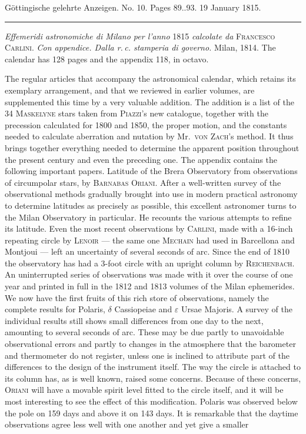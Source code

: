 \clearpage
{}
\hypertarget{native-579-lower}{}
\begin{center}\small Göttingische gelehrte Anzeigen. No. 10. Pages 89..93. 19 January 1815.\\[3pt]\rule{.72\linewidth}{.3pt}\end{center}

{\setlength{\rightskip}{0pt plus 3em}\emph{Effemeridi astronomiche di Milano per l'anno} 1815 \emph{calcolate da} \textsc{Francesco Carlini}.
\emph{Con appendice. Dalla r.\,c. stamperia di governo.} Milan, 1814. The calendar has 128 pages and the appendix 118, in octavo.\par}

The regular articles that accompany the astronomical calendar, which retains its exemplary arrangement, and that we reviewed in earlier volumes, are supplemented this time by a very valuable addition. The addition is a list of the 34 \textsc{Maskelyne} stars taken from \textsc{Piazzi}’s new catalogue, together with the precession calculated for 1800 and 1850, the proper motion, and the constants needed to calculate aberration and nutation by Mr.\ \textsc{von Zach}’s method. It thus brings together everything needed to determine the apparent position throughout the present century and even the preceding one. The appendix contains the following important papers. Latitude of the Brera Observatory from observations of circumpolar stars, by \textsc{Barnabas Oriani}. After a well-written survey of the observational methods gradually brought into use in modern practical astronomy to determine latitudes as precisely as possible, this excellent astronomer turns to the Milan Observatory in particular. He recounts the various attempts to refine its latitude. Even the most recent observations by \textsc{Carlini}, made with a 16-inch repeating circle by \textsc{Lenoir} — the same one \textsc{Mechain} had used in Barcellona and Montjoui — left an uncertainty of several seconds of arc. Since the end of 1810 the observatory has had a 3-foot circle with an upright column by \textsc{Reichenbach}. An uninterrupted series of observations was made with it over the course of one year and printed in full in the 1812 and 1813 volumes of the Milan ephemerides. We now have the first fruits of this rich store of observations, namely the complete results for Polaris, $\delta$ Cassiopeiae and $\varepsilon$ Ursae Majoris. A survey of the individual results still shows small differences from one day to the next, amounting to several seconds of arc. These may be due partly to unavoidable observational errors and partly to changes in the atmosphere that the barometer and thermometer do not register, unless one is inclined to attribute part of the differences to the design of the instrument itself. The way the circle is attached to its column has, as is well known, raised some concerns. Because of these concerns, \textsc{Oriani} will have a movable spirit level fitted to the circle itself, and it will be most interesting to see the effect of this modification. Polaris was observed below the pole on 159 days and above it on 143 days. It is remarkable that the daytime observations agree less well with one another and yet give a smaller 